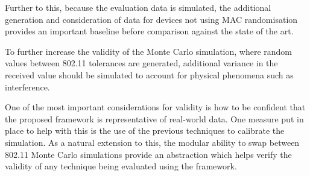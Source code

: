 Further to this, because the evaluation data is simulated, the additional generation and consideration of data for devices not using MAC randomisation provides an important baseline before comparison against the state of the art.

To further increase the validity of the Monte Carlo simulation, where random values between 802.11 tolerances are generated, additional variance in the received value should be simulated to account for physical phenomena such as interference.

One of the most important considerations for validity is how to be confident that the proposed framework is representative of real-world data.
One measure put in place to help with this is the use of the previous techniques to calibrate the simulation.
As a natural extension to this, the modular ability to swap between 802.11 Monte Carlo simulations provide an abstraction which helps verify the validity of any technique being evaluated using the framework.
